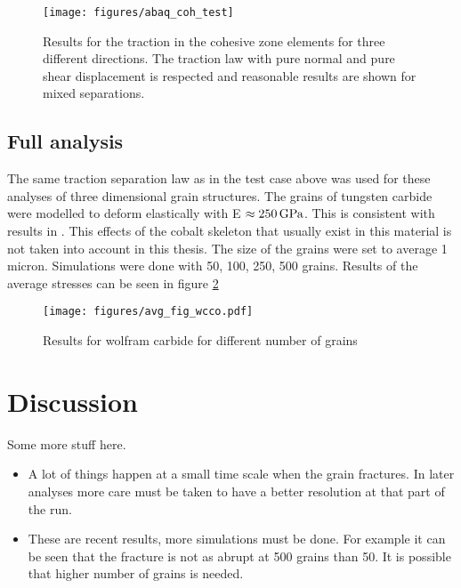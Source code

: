 \documentclass[wcco.tex]{subfiles}
\begin{document}
\begin{figure}[ht]
\centering
\texttt{[image: figures/abaq\_coh\_test]}
\caption{Results for the traction in the cohesive zone elements for three different directions. The traction law with pure normal and pure shear displacement is respected and reasonable results are shown for mixed separations. }
\label{fig:test_cases}
\end{figure}


\subsection{Full analysis}

The same traction separation law as in the test case above was used for these analyses of three dimensional grain structures. The grains of tungsten carbide were modelled to deform elastically with E $\approx \unit[250]{GPa}$. This is consistent with results in \cite{Buss04}.
This effects of the cobalt skeleton that usually exist in this material is not taken into account in this thesis. The size of the grains were set to average 1 micron. Simulations were done with 50, 100, 250, 500 grains. Results of the average stresses can be seen in figure \ref{fig:wcco_res}

\begin{figure}[ht]
\centering
\texttt{[image: figures/avg\_fig\_wcco.pdf]}
\caption{Results for wolfram carbide for different number of grains}
\label{fig:wcco_res}
\end{figure}


\section{Discussion}
Some more stuff here.
\begin{itemize}
\item A lot of things happen at a small time scale when the grain fractures. In later analyses more care must be taken to have a better resolution at that part of the run.
\item These are recent results, more simulations must be done. For example it can be seen that the fracture is not as abrupt at 500 grains than 50. It is possible that higher number of grains is needed.
\end{itemize}
\end{document}
